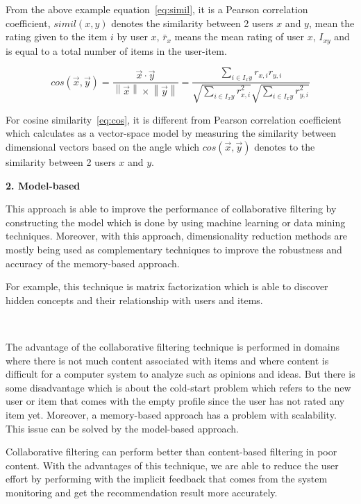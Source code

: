 \documentclass[12pt,oneside,openright,a4paper]{cpe-english-project}
\begin{document}
From the above example equation~\ref{eq:simil}, it is a Pearson correlation coefficient, $simil(x, y)$ denotes the similarity between 2 users $x$ and $y$, mean the rating given to the item $i$ by user $x$, $\bar{r}_{x}$ means the mean rating of user $x$, $I_{xy}$ and is equal to a total number of items in the user-item.


\begin{equation}\label{eq:cos}
cos(\vec{x},\vec{y}) 
=\frac{\vec{x}\cdot \vec{y}}{\left \| \vec{x} \right \|\times \left \| \vec{y} \right \|}
=\frac{\sum_{i\in I_xy}^{}r_{x,i}r_{y,i}}
{\sqrt{\sum_{i\in I_xy}^{}r_{x,i}^2}\sqrt{\sum_{i\in I_xy}^{}r_{y,i}^2}}
\end{equation}

For cosine similarity~\ref{eq:cos}, it is different from Pearson correlation coefficient which calculates as a vector-space model by measuring the similarity between dimensional vectors based on the angle which $cos(\vec{x},\vec{y})$ denotes to the similarity between 2 users $x$ and $y$.


\textbf{2. Model-based}\par

This approach is able to improve the performance of collaborative filtering by constructing the model which is done by using machine learning or data mining techniques. Moreover, with this approach, dimensionality reduction methods are mostly being used as complementary techniques to improve the robustness and accuracy of the memory-based approach. \cite{Recommendersystem}

For example, this technique is matrix factorization which is able to discover hidden concepts and their relationship with users and items.

\

The advantage of the collaborative filtering technique is performed in domains where there is not much content associated with items and where content is difficult for a computer system to analyze such as opinions and ideas. \cite{Recommendersystem} But there is some disadvantage which is about the cold-start problem which refers to the new user or item that comes with the empty profile since the user has not rated any item yet. Moreover, a memory-based approach has a problem with scalability. This issue can be solved by the model-based approach.

Collaborative filtering can perform better than content-based filtering in poor content. With the advantages of this technique, we are able to reduce the user effort by performing with the implicit feedback that comes from the system monitoring and get the recommendation result more accurately.
\end{document}
